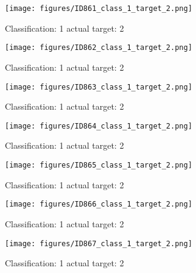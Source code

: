 \begin{figure}[h!]
\begin{center}
\texttt{[image: figures/ID861\_class\_1\_target\_2.png]}
\end{center}
\caption{ Classification: 1 actual target: 2}
\label{fig:ID861_class_1_target_2}
\end{figure}
\begin{figure}[h!]
\begin{center}
\texttt{[image: figures/ID862\_class\_1\_target\_2.png]}
\end{center}
\caption{ Classification: 1 actual target: 2}
\label{fig:ID862_class_1_target_2}
\end{figure}
\begin{figure}[h!]
\begin{center}
\texttt{[image: figures/ID863\_class\_1\_target\_2.png]}
\end{center}
\caption{ Classification: 1 actual target: 2}
\label{fig:ID863_class_1_target_2}
\end{figure}
\begin{figure}[h!]
\begin{center}
\texttt{[image: figures/ID864\_class\_1\_target\_2.png]}
\end{center}
\caption{ Classification: 1 actual target: 2}
\label{fig:ID864_class_1_target_2}
\end{figure}
\begin{figure}[h!]
\begin{center}
\texttt{[image: figures/ID865\_class\_1\_target\_2.png]}
\end{center}
\caption{ Classification: 1 actual target: 2}
\label{fig:ID865_class_1_target_2}
\end{figure}
\begin{figure}[h!]
\begin{center}
\texttt{[image: figures/ID866\_class\_1\_target\_2.png]}
\end{center}
\caption{ Classification: 1 actual target: 2}
\label{fig:ID866_class_1_target_2}
\end{figure}
\begin{figure}[h!]
\begin{center}
\texttt{[image: figures/ID867\_class\_1\_target\_2.png]}
\end{center}
\caption{ Classification: 1 actual target: 2}
\label{fig:ID867_class_1_target_2}
\end{figure}
